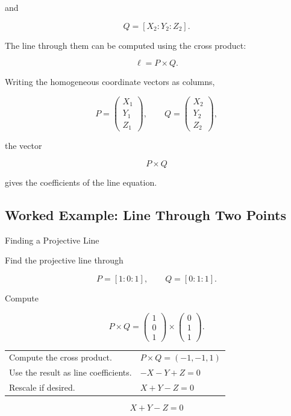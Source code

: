 and

\[
Q=[X_2:Y_2:Z_2].
\]

The line through them can be computed using the cross product:

\[
\boxed{
\ell=P\times Q.
}
\]

Writing the homogeneous coordinate vectors as columns,

\[
P=
\begin{pmatrix}
X_1\\Y_1\\Z_1
\end{pmatrix},
\qquad
Q=
\begin{pmatrix}
X_2\\Y_2\\Z_2
\end{pmatrix},
\]

the vector

\[
P\times Q
\]

gives the coefficients of the line equation.

\subsection{Worked Example: Line Through Two Points}
\label{subsec:worked-projective-line-two-points}

\begin{workedexamplebox}{Finding a Projective Line}

Find the projective line through

\[
P=[1:0:1],
\qquad
Q=[0:1:1].
\]

Compute

\[
P\times Q
=
\begin{pmatrix}
1\\0\\1
\end{pmatrix}
\times
\begin{pmatrix}
0\\1\\1
\end{pmatrix}.
\]

\begin{tabularx}{\textwidth}{@{}>{\raggedright\arraybackslash}p{}X@{}}
Compute the cross product. &
\(P\times Q=(-1,-1,1)\)\\
Use the result as line coefficients. &
\(-X-Y+Z=0\)\\
Rescale if desired. &
\(X+Y-Z=0\)
\end{tabularx}

\begin{answerbox}
\[
\boxed{X+Y-Z=0}
\]
\end{answerbox}
\end{workedexamplebox}

